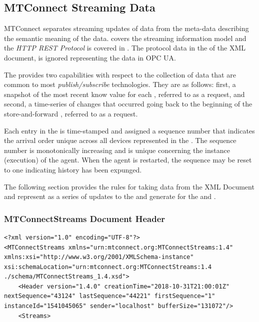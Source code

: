 \FloatBarrier

\subsection{MTConnect Streaming Data}

MTConnect separates streaming updates of data from the meta-data describing the semantic meaning of the data. \cite{MTCPart3} covers the streaming information model and the \textit{HTTP REST Protocol}\cite{Fielding2000ArchitecturalArchitectures} is covered in \cite{MTCPart1}. The protocol data in the  of the XML document, is ignored representing the data in OPC UA. 

The   provides two capabilities with respect to the collection of data that are common to most \textit{publish/subscribe} technologies. They are as follows: first, a snapshot of the most recent know value for each , referred to as a  request, and second, a time-series of changes that occurred going back to the beginning of the store-and-forward , referred to as a  request.

Each entry in the  is time-stamped and assigned a sequence number that indicates the arrival order unique across all devices represented in the . The sequence number is monotonically increasing and is unique concerning the instance (execution) of the agent. When the agent is restarted, the sequence may be reset to one indicating history has been expunged. 

The following section provides the rules for taking data from the  XML Document and represent as a series of updates to the  and generate  for the  and  .

\subsubsection{MTConnectStreams Document Header}

\begin{lstlisting}[firstnumber=1,escapechar=|,%
    caption={Streams Header},label={lst:streams-header}]
<?xml version="1.0" encoding="UTF-8"?>
<MTConnectStreams xmlns="urn:mtconnect.org:MTConnectStreams:1.4" xmlns:xsi="http://www.w3.org/2001/XMLSchema-instance" xsi:schemaLocation="urn:mtconnect.org:MTConnectStreams:1.4 ./schema/MTConnectStreams_1.4.xsd">
	<Header version="1.4.0" creationTime="2018-10-31T21:00:01Z" nextSequence="43124" lastSequence="44221" firstSequence="1" instanceId="1541045065" sender="localhost" bufferSize="131072"/>
	<Streams>
\end{lstlisting}

